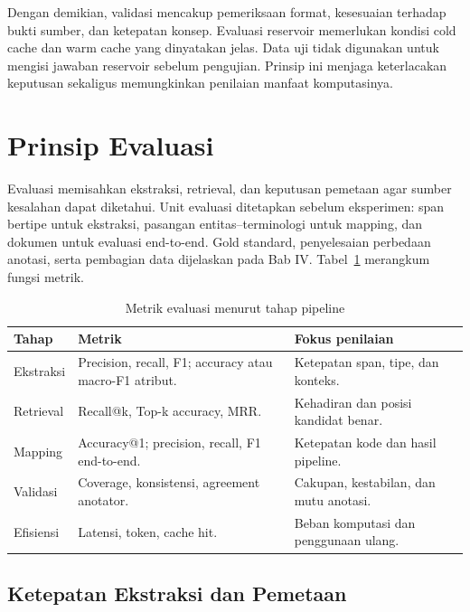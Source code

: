 Dengan demikian, validasi mencakup pemeriksaan format, kesesuaian terhadap bukti sumber, dan ketepatan konsep. Evaluasi reservoir memerlukan kondisi cold cache dan warm cache yang dinyatakan jelas. Data uji tidak digunakan untuk mengisi jawaban reservoir sebelum pengujian. Prinsip ini menjaga keterlacakan keputusan sekaligus memungkinkan penilaian manfaat komputasinya.

\section{Prinsip Evaluasi}

Evaluasi memisahkan ekstraksi, retrieval, dan keputusan pemetaan agar sumber kesalahan dapat diketahui. Unit evaluasi ditetapkan sebelum eksperimen: span bertipe untuk ekstraksi, pasangan entitas--terminologi untuk mapping, dan dokumen untuk evaluasi end-to-end. Gold standard, penyelesaian perbedaan anotasi, serta pembagian data dijelaskan pada Bab IV. Tabel~\ref{tab:ringkasan-metrik-evaluasi} merangkum fungsi metrik.

\begin{table}[htbp]
\centering
\small
\caption{Metrik evaluasi menurut tahap pipeline}
\label{tab:ringkasan-metrik-evaluasi}
\begin{tabularx}{\textwidth}{@{}>{\raggedright\arraybackslash}p{2.5cm} >{\raggedright\arraybackslash}X >{\raggedright\arraybackslash}X@{}}
\toprule
\textbf{Tahap} & \textbf{Metrik} & \textbf{Fokus penilaian} \\
\midrule
Ekstraksi & Precision, recall, F1; accuracy atau macro-F1 atribut. & Ketepatan span, tipe, dan konteks. \\
Retrieval & Recall@k, Top-k accuracy, MRR. & Kehadiran dan posisi kandidat benar. \\
Mapping & Accuracy@1; precision, recall, F1 end-to-end. & Ketepatan kode dan hasil pipeline. \\
Validasi & Coverage, konsistensi, agreement anotator. & Cakupan, kestabilan, dan mutu anotasi. \\
Efisiensi & Latensi, token, cache hit. & Beban komputasi dan penggunaan ulang. \\
\bottomrule
\end{tabularx}
\end{table}

\subsection{Ketepatan Ekstraksi dan Pemetaan}

